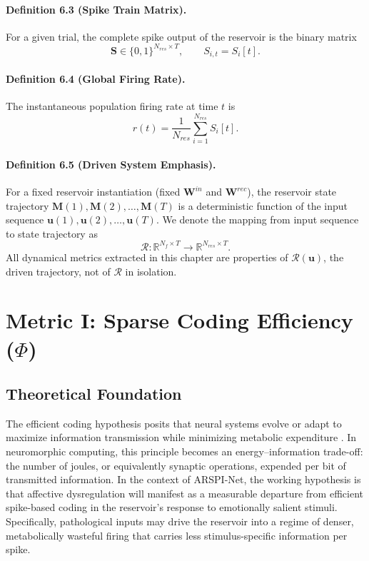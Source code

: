 \paragraph{Definition 6.3 (Spike Train Matrix).}
For a given trial, the complete spike output of the reservoir is the binary matrix
\begin{equation}
\mathbf{S} \in \{0,1\}^{N_{res}\times T}, \qquad S_{i,t}=S_i[t].
\end{equation}

\paragraph{Definition 6.4 (Global Firing Rate).}
The instantaneous population firing rate at time $t$ is
\begin{equation}
r(t)=\frac{1}{N_{res}}\sum_{i=1}^{N_{res}} S_i[t].
\end{equation}

\paragraph{Definition 6.5 (Driven System Emphasis).}
For a fixed reservoir instantiation (fixed $\mathbf{W}^{in}$ and $\mathbf{W}^{rec}$), the reservoir state trajectory $\mathbf{M}(1),\mathbf{M}(2),\ldots,\mathbf{M}(T)$ is a deterministic function of the input sequence $\mathbf{u}(1),\mathbf{u}(2),\ldots,\mathbf{u}(T)$. We denote the mapping from input sequence to state trajectory as
\begin{equation}
\mathcal{R}: \mathbb{R}^{N_f \times T} \rightarrow \mathbb{R}^{N_{res} \times T}.
\end{equation}
All dynamical metrics extracted in this chapter are properties of $\mathcal{R}(\mathbf{u})$, the driven trajectory, not of $\mathcal{R}$ in isolation.

\section{Metric I: Sparse Coding Efficiency ($\Phi$)}
\label{sec:dynamics_phi}

\subsection{Theoretical Foundation}

The efficient coding hypothesis posits that neural systems evolve or adapt to maximize information transmission while minimizing metabolic expenditure \cite{barlow_possible_1961,olshausen_emergence_1996}. In neuromorphic computing, this principle becomes an energy--information trade-off: the number of joules, or equivalently synaptic operations, expended per bit of transmitted information. In the context of ARSPI-Net, the working hypothesis is that affective dysregulation will manifest as a measurable departure from efficient spike-based coding in the reservoir's response to emotionally salient stimuli. Specifically, pathological inputs may drive the reservoir into a regime of denser, metabolically wasteful firing that carries less stimulus-specific information per spike.

